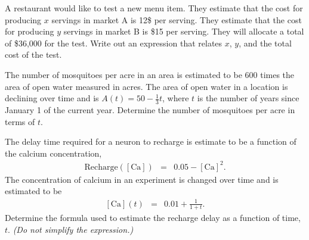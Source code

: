 
\begin{problem}
\item A restaurant would like to test a new menu item. They estimate
  that the cost for producing $x$ servings in market A is 12\$ per
  serving. They estimate that the cost for producing $y$ servings in
  market B is \$15 per serving.  They will allocate a total of
  \$36,000 for the test. Write out an expression that relates $x$,
  $y$, and the total cost of the test.

  \vfill

\item The number of mosquitoes per acre in an area is estimated to be
  600 times the area of open water measured in acres. The area of open
  water in a location is declining over time and is
  $A(t)=50-\frac{1}{3}t$, where $t$ is the number of years since
  January 1 of the current year. Determine the number of mosquitoes
  per acre in terms of $t$.
  \vfill
\item The delay time required for a neuron to recharge is estimate to
  be a function of the calcium concentration,
  \begin{eqnarray*}
    \mathrm{Recharge([Ca])} & = & 0.05-\mathrm{[Ca]}^2.
  \end{eqnarray*}
  The concentration of calcium in an experiment is changed over time
  and is estimated to be
  \begin{eqnarray*}
    \mathrm{[Ca]}(t) & = & 0.01+\frac{1}{1+t}.
  \end{eqnarray*}
  Determine the formula used to estimate the recharge delay as a
  function of time, $t$. \textit{(Do not simplify the expression.)}
  \vfill
\end{problem}


